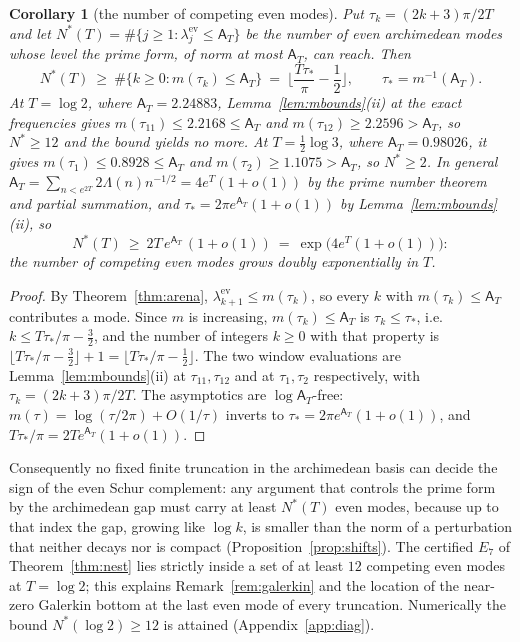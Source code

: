 \documentclass[11pt]{amsart}
\newtheorem{corollary}[theorem]{Corollary}
\theoremstyle{definition}
\theoremstyle{remark}
\newcommand{\Aconst}{\mathsf A_T}
\begin{document}
\begin{corollary}[the number of competing even modes]\label{cor:arena}
Put $\tau_k=(2k+3)\pi/2T$ and let
$N^*(T)=\#\{j\ge1:\lambda^{\mathrm{ev}}_j\le\Aconst\}$ be the number of even archimedean modes
whose level the prime form, of norm at most $\Aconst$, can reach. Then
\[
N^*(T)\ \ge\ \#\{k\ge0:m(\tau_k)\le\Aconst\}\ =\ \Big\lfloor\frac{T\tau_*}{\pi}-\frac12\Big\rfloor,
\qquad \tau_*=m^{-1}(\Aconst).
\]
At $T=\log2$, where $\Aconst=2.24883$, Lemma~\ref{lem:mbounds}(ii) at the exact frequencies gives
$m(\tau_{11})\le2.2168\le\Aconst$ and $m(\tau_{12})\ge2.2596>\Aconst$, so $N^*\ge12$ and the
bound yields no more. At $T=\frac12\log3$, where $\Aconst=0.98026$, it gives
$m(\tau_1)\le0.8928\le\Aconst$ and $m(\tau_2)\ge1.1075>\Aconst$, so $N^*\ge2$. In general
$\Aconst=\sum_{n<e^{2T}}2\Lambda(n)n^{-1/2}=4e^{T}(1+o(1))$ by the prime number theorem and
partial summation, and $\tau_*=2\pi e^{\Aconst}(1+o(1))$ by Lemma~\ref{lem:mbounds}(ii), so
\[
N^*(T)\ \ge\ 2T\,e^{\Aconst}\,(1+o(1))\ =\ \exp\big(4e^{T}(1+o(1))\big):
\]
the number of competing even modes grows doubly exponentially in $T$.
\end{corollary}
\begin{proof}
By Theorem~\ref{thm:arena}, $\lambda^{\mathrm{ev}}_{k+1}\le m(\tau_k)$, so every $k$ with
$m(\tau_k)\le\Aconst$ contributes a mode. Since $m$ is increasing, $m(\tau_k)\le\Aconst$ is
$\tau_k\le\tau_*$, i.e.\ $k\le T\tau_*/\pi-\frac32$, and the number of integers $k\ge0$ with that
property is $\lfloor T\tau_*/\pi-\frac32\rfloor+1=\lfloor T\tau_*/\pi-\frac12\rfloor$. The two
window evaluations are Lemma~\ref{lem:mbounds}(ii) at $\tau_{11},\tau_{12}$ and at
$\tau_1,\tau_2$ respectively, with $\tau_k=(2k+3)\pi/2T$. The asymptotics are
$\log\Aconst$-free: $m(\tau)=\log(\tau/2\pi)+O(1/\tau)$ inverts to
$\tau_*=2\pi e^{\Aconst}(1+o(1))$, and $T\tau_*/\pi=2Te^{\Aconst}(1+o(1))$.
\end{proof}

Consequently no fixed finite truncation in the archimedean basis can decide the sign of the even
Schur complement: any argument that controls the prime form by the archimedean gap must carry at
least $N^*(T)$ even modes, because up to that index the gap, growing like $\log k$, is smaller than
the norm of a perturbation that neither decays nor is compact (Proposition~\ref{prop:shifts}). The
certified $E_7$ of Theorem~\ref{thm:nest} lies strictly inside a set of at least $12$ competing even
modes at $T=\log2$; this explains Remark~\ref{rem:galerkin} and the location of the near-zero
Galerkin bottom at the last even mode of every truncation. Numerically the bound $N^*(\log2)\ge12$ is
attained (Appendix~\ref{app:diag}).
\end{document}
